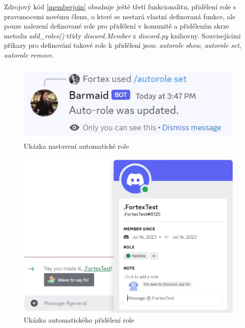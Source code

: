 \documentclass[
  program=inf,
biblatex=false,
sourcecodes=true,
joinlists=true,
  figures=true,
  tables=true,
  glossaries=true,
  index=false
]{kidiplom}
\begin{document}
\newpage
Zdrojový kód \ref{memberjoin} obsahuje ještě třetí funkcionalitu, přidělení role s pravomocemi novému členu,
o které se nestará vlastní definovaná funkce, ale pouze nalezení definované role pro přidělení v komunitě a přidělením
skrze metodu {\it add\_roles()} třídy {\it discord.Member} z {\it discord.py} knihovny. Souvisejícími příkazy pro definování
takové role k přidělení jsou: {\it autorole show}, {\it autorole set}, {\it autorole remove}.

\begin{figure}[h!]
  \centering \includegraphics[scale=0.99]{autorole_set}
  \caption{\label{autorole_set}Ukázka nastavení automatické role}
\end{figure}

\begin{figure}[h!]
  \centering \includegraphics[scale=0.7]{autorole_given}
  \caption{\label{autorole_given}Ukázka automatického přidělení role}
\end{figure}

\newpage
\end{document}
